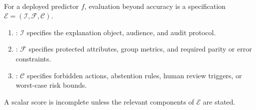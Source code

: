 \begin{remark} \label{rem:sl-evaluation-beyond-accuracy} \\
For a deployed predictor $f$, evaluation beyond accuracy is a specification $\mathcal{E}=(\mathcal{I},\mathcal{F},\mathcal{C})$.
\begin{enumerate}[label=(\roman*)]
\setlength{\itemsep}{0pt}
\item {}: $\mathcal{I}$ specifies the explanation object, audience, and audit protocol.
\item {}: $\mathcal{F}$ specifies protected attributes, group metrics, and required parity or error constraints.
\item {}: $\mathcal{C}$ specifies forbidden actions, abstention rules, human review triggers, or worst-case risk bounds.
\end{enumerate}
A scalar score is incomplete unless the relevant components of $\mathcal{E}$ are stated.
\end{remark}
